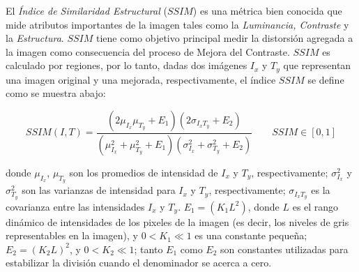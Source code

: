 El \textit{Índice de Similaridad Estructural} ($SSIM$) \cite{wang2004image} es una métrica bien conocida que mide atributos importantes de la imagen tales como la \textit{Luminancia, Contraste} y la \textit{Estructura}. $SSIM$ tiene como objetivo principal medir la distorsión agregada a la imagen como consecuencia del proceso de Mejora del Contraste. $SSIM$ es calculado por regiones, por lo tanto, dadas dos imágenes $I_x$ y $T_y$ que representan una imagen original y una mejorada, respectivamente, el índice $SSIM$ se define como se muestra abajo: 


\begin{equation}
SSIM(I,T)\label{symbol:ssim} = \frac{(2\mu_{I_x} \mu_{T_y}+E_1)(2\sigma_{I_xT_y}+E_2)}{(\mu^2_{I_x}+\mu^2_{T_y}+E_1)(\sigma^2_{I_x} + \sigma^2_{T_y}+E_2)} \qquad SSIM \in [0,1]
\end{equation}

donde $\mu_{I_x}$\label{symbol:ssimmui}, $\mu_{T_y}$\label{symbol:ssimmut} son los promedios de intensidad de $I_x$ y $T_y$, respectivamente; $\sigma^2_{I_x}$\label{symbol:ssimsigmai} y $\sigma^2_{T_y}$\label{symbol:ssimsigmat} son las varianzas de intensidad para $I_x$ y $T_y$, respectivamente; $\sigma_{I_xT_y}$\label{symbol:ssimsigmait} es la covarianza entre las intensidades $I_x$ y $T_y$. $E_1=(K_1L^2)$, donde $L$ es el rango dinámico de intensidades de los pixeles de la imagen (es decir, los niveles de gris representables en la imagen), y $0 < K_1 \ll 1$ es una constante pequeña; $E_2=(K_2L)^2$, y $0 < K_2 \ll 1$; tanto $E_1$ como $E_2$ son constantes utilizadas para estabilizar la división cuando el denominador se acerca a cero.

